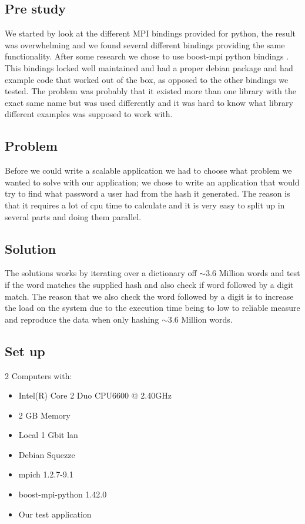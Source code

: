 \documentclass{article}
\begin{document}
\subsection{Pre study}
We started by look at the different MPI bindings provided for python, the result
was overwhelming and we found several different bindings providing the same
functionality. After some research we chose to use boost-mpi python bindings
\cite{boost-mpi}. This bindings locked well maintained and had a proper
debian package and had example code that worked out of the box, as opposed to
the other bindings we tested. The problem was probably that it existed more
than one library with the exact same name but was used differently and it was
hard to know what library different examples was supposed to work with. 

\subsection{Problem}
Before we could write a scalable application we had to choose what problem we
wanted to solve with our application; we chose to write an application that
would try to find what password a user had from the hash it generated.
The reason is that it requires a lot of cpu time to calculate and it is 
very easy to split up in several parts and doing them parallel.

\subsection{Solution}
The solutions works by iterating over a dictionary off $\sim$3.6 Million words
and test if the word matches the supplied hash and also check if word followed
by a digit match. The reason that we also check the word followed by a digit
is to increase the load on the system due to the execution time being to 
low to reliable measure and reproduce the data when only hashing $\sim$3.6
Million words.

\subsection{Set up}
2 Computers with:
\begin{itemize}
\item Intel(R) Core 2 Duo CPU6600  @ 2.40GHz
\item 2 GB Memory
\item Local 1 Gbit lan
\item Debian Squezze
\item mpich 1.2.7-9.1
\item boost-mpi-python 1.42.0
\item Our test application \cite{pympi-test}
\end{itemize}
\end{document}
